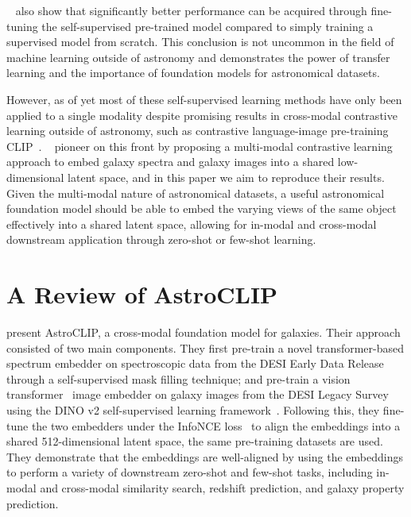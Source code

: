 \documentclass[a4paper,11pt]{article}
\begin{document}
~\cite{hayat2021} also show that significantly better performance can be acquired through fine-tuning the self-supervised
pre-trained model compared to simply training a supervised model from scratch.
This conclusion is not uncommon in the field of machine learning outside of astronomy and demonstrates the power
of transfer learning and the importance of foundation models for astronomical datasets.

However, as of yet most of these self-supervised learning methods have only been applied to a single modality despite
promising results in cross-modal contrastive learning outside of astronomy, such as contrastive language-image pre-training CLIP~\citep{radford2021}.
~\cite{astroclip} pioneer on this front by proposing a multi-modal contrastive learning approach to embed galaxy spectra
and galaxy images into a shared low-dimensional latent space, and in this paper we aim to reproduce their results.
Given the multi-modal nature of astronomical datasets, a useful astronomical foundation model should be able to embed
the varying views of the same object effectively into a shared latent space, allowing for in-modal and cross-modal downstream
application through zero-shot or few-shot learning.

\section{A Review of AstroCLIP}\label{sec:original-paper}
\cite{astroclip} present AstroCLIP, a cross-modal foundation model for galaxies.
Their approach consisted of two main components.
They first pre-train a novel transformer-based spectrum embedder on spectroscopic data from the DESI Early Data Release~\citep{desiearly2023}
through a self-supervised mask filling technique; and pre-train a vision transformer~\citep{dosovitskiy2021} image embedder
on galaxy images from the DESI Legacy Survey~\citep{desilegacy2018} using the DINO v2 self-supervised learning framework~\citep{oquab2024}.
Following this, they fine-tune the two embedders under the InfoNCE loss~\citep{oord2019} to align the embeddings
into a shared 512-dimensional latent space, the same pre-training datasets are used.
They demonstrate that the embeddings are well-aligned by using the embeddings to perform a variety of downstream zero-shot
and few-shot tasks, including in-modal and cross-modal similarity search, redshift prediction, and galaxy property prediction.
\end{document}
